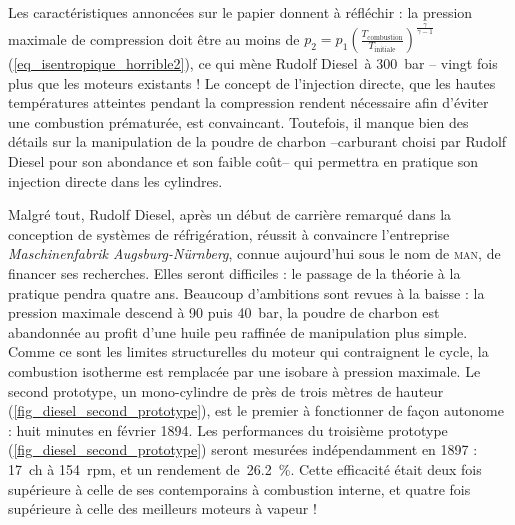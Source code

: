 	Les caractéristiques annoncées sur le papier donnent à réfléchir : la pression maximale de compression doit être au moins de $p_2 = p_1 \left( \frac{T_\text{combustion}}{T_\text{initiale}} \right)^{\frac{\gamma}{\gamma -1}}$ (\ref{eq_isentropique_horrible2}), ce qui mène Rudolf Diesel~à \SI{300}{\bar} -- vingt fois plus que les moteurs existants ! Le concept de l’injection directe, que les hautes températures atteintes pendant la compression rendent nécessaire afin d’éviter une combustion prématurée, est convaincant. Toutefois, il manque bien des détails sur la manipulation de la poudre de charbon --carburant choisi par Rudolf Diesel pour son abondance et son faible coût-- qui permettra en pratique son injection directe dans les cylindres.

	Malgré tout, Rudolf Diesel, après un début de carrière remarqué dans la conception de systèmes de réfrigération, réussit à convaincre l’entreprise \textit{Maschinenfabrik Augsburg-Nürnberg}, connue aujourd’hui sous le nom de \textsc{man}, de financer ses recherches. Elles seront difficiles : le passage de la théorie à la pratique pendra quatre ans. Beaucoup d’ambitions sont revues à la baisse : la pression maximale descend à \num{90} puis \SI{40}{\bar}, la poudre de charbon est abandonnée au profit d’une huile peu raffinée de manipulation plus simple. Comme ce sont les limites structurelles du moteur qui contraignent le cycle, la combustion isotherme est remplacée par une isobare à pression maximale. Le second prototype, un mono-cylindre de près de trois mètres de hauteur (\cref{fig_diesel_second_prototype}), est le premier à fonctionner de façon autonome : huit minutes en février 1894. Les performances du troisième prototype (\cref{fig_diesel_second_prototype})	seront mesurées indépendamment en 1897 : \SI{17}{ch} à \SI{154}{rpm}, et un rendement de~\SI{26,2}{\percent}. Cette efficacité était deux fois supérieure à celle de ses contemporains à combustion interne, et quatre fois supérieure à celle des meilleurs moteurs à vapeur !

